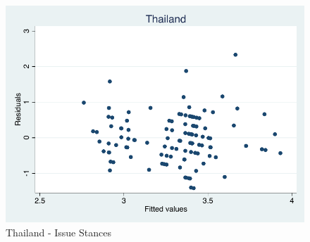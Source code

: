 \documentclass[12pt, titlepage]{article}
\begin{document}
\begin{figure}[H]
	\centering
	\includegraphics[width=\textwidth]{Residuals/CountryLib/Thailand}
	\caption{Thailand - Issue Stances}
	\label{Thailand}
\end{figure}
\end{document}
